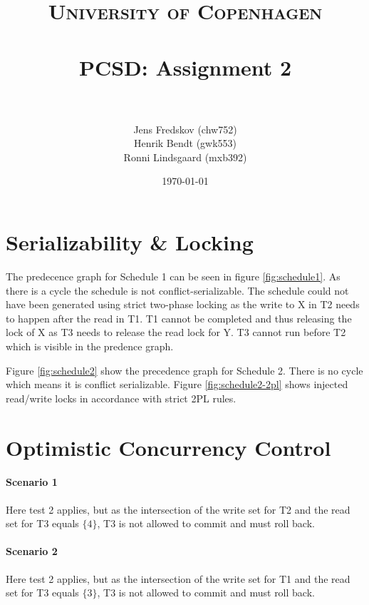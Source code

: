 \documentclass[a4paper, 11pt]{article}
\title{ 
\normalfont \normalsize 
\textsc{University of Copenhagen} \\ [25pt]
\horrule{0.5pt} \\[0.4cm]
\huge PCSD: Assignment 2 \\
\horrule{2pt} \\[0.5cm]
}
\author{Jens Fredskov (chw752)\\Henrik Bendt (gwk553)\\Ronni Lindsgaard (mxb392)} %
\date{\normalsize\today} %
\begin{document}
\maketitle
\pagebreak

\section{Serializability \& Locking} %
\label{sec:serializability_&_locking}

The predecence graph for Schedule 1 can be seen in figure \ref{fig:schedule1}.
As there is a cycle the schedule is not conflict-serializable. The schedule
could not have been generated using strict two-phase locking as the write to X
in T2 needs to happen after the read in T1. T1 cannot be completed and thus
releasing the lock of X as T3 needs to release the read lock for Y. T3 cannot
run before T2 which is visible in the predence graph. 



Figure \ref{fig:schedule2} show the precedence graph for Schedule 2. There is no
cycle which means it is conflict serializable. Figure \ref{fig:schedule2-2pl}
shows injected read/write locks in accordance with strict 2PL rules.
 




\section{Optimistic Concurrency Control} %
\label{sec:optimistic_concurrency_control}

\paragraph{Scenario 1} %
\label{par:scenario_1}

Here test 2 applies, but as the intersection of the write set for T2 and the read set for T3 equals $\{4\}$, T3 is not allowed to commit and must roll back.


\paragraph{Scenario 2} %
\label{par:scenario_2}

Here test 2 applies, but as the intersection of the write set for T1 and the read set for T3 equals $\{3\}$, T3 is not allowed to commit and must roll back. 
\end{document}
